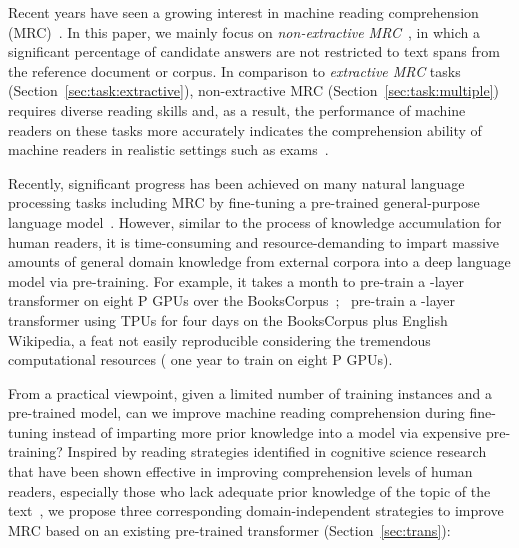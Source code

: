 \documentclass[11pt,a4paper]{article}
\begin{document}
Recent years have seen a growing interest in machine reading comprehension (MRC)~\cite{rajpurkar2016squad,choi2018quac,kovcisky2018narrativeqa,reddy2018coqa}. In this paper, we mainly focus on \textit{non-extractive MRC}~\cite{khashabi2018looking,ostermann2018semeval,clark2018think}, in which a significant percentage of candidate answers are not restricted to text spans from the reference document or corpus. In comparison to \textit{extractive MRC} tasks (Section~\ref{sec:task:extractive}), non-extractive MRC (Section~\ref{sec:task:multiple}) requires diverse reading skills and, as a result, the performance of machine readers on these tasks more accurately indicates the comprehension ability of machine readers in realistic settings such as exams~\cite{lai2017race}. 

Recently, significant progress has been achieved on many natural language processing tasks including MRC by fine-tuning a pre-trained general-purpose language model~\cite{radfordimproving,bert2018}. 
However, similar to the process of knowledge accumulation for human readers, it is time-consuming and resource-demanding to impart massive amounts of general domain knowledge from external corpora into a deep language model via pre-training. For example, it takes a month to pre-train a -layer transformer on eight P GPUs over the BooksCorpus~\cite{zhu2015aligning,radfordimproving};~ pre-train a -layer transformer using  TPUs for four days on the BooksCorpus plus English Wikipedia, a feat not easily reproducible considering the tremendous computational resources ( one year to train on eight P GPUs).  

From a practical viewpoint, given a limited number of training instances and a pre-trained model, can we improve machine reading comprehension during fine-tuning instead of imparting more prior knowledge into a model via expensive pre-training? Inspired by reading strategies identified in cognitive science research that have been shown effective in improving comprehension levels of human readers, especially those who lack adequate prior knowledge of the topic of the text~\cite{mokhtari2002measuring,mokhtari2002assessing,mcnamara2004istart}, we propose three corresponding domain-independent strategies to improve MRC based on an existing pre-trained transformer (Section~\ref{sec:trans}): 
\end{document}
